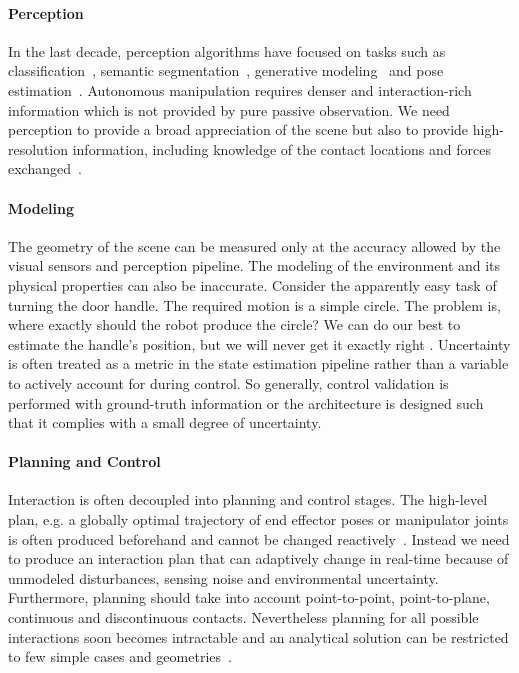\paragraph{Perception}  In the last decade, perception algorithms have focused on tasks such as classification~\citep{redmon2016you}, semantic segmentation~\cite{badrinarayanan2017segnet}, generative modeling~\citep{karras2019stylebased} and pose estimation~\cite{xiang2017posecnn}. Autonomous manipulation requires denser and interaction-rich information which is not provided by pure passive observation. We need perception to provide a broad appreciation of the scene but also to provide high-resolution information, including knowledge of the contact locations and forces exchanged~\cite{mason2018toward}. 

\paragraph{Modeling} The geometry of the scene can be measured only at the accuracy allowed by the visual sensors and perception pipeline. The modeling of the environment and its physical properties can also be inaccurate. Consider the apparently easy task of turning the door handle. The required motion is a simple circle. The problem is, where exactly should the robot produce the circle? We can do our best to estimate the handle’s position, but we will never get it exactly right \citep{mason2018toward}. Uncertainty is often treated as a metric in the state estimation pipeline rather than a variable to actively account for during control. So generally, control validation is performed with ground-truth information or the architecture is designed such that it complies with a small degree of uncertainty.

\paragraph{Planning and Control} Interaction is often decoupled into planning and control stages. The high-level plan, e.g. a globally optimal trajectory of end effector poses or manipulator joints is often produced beforehand and cannot be changed reactively~\cite{chitta2012moveit}. Instead we need to produce an interaction plan that can adaptively change in real-time because of unmodeled disturbances, sensing noise and environmental uncertainty. Furthermore, planning should take into account point-to-point, point-to-plane, continuous and discontinuous contacts. Nevertheless planning for all possible interactions soon becomes intractable and an analytical solution can be restricted to few simple cases and geometries~\cite{lee2015hierarchical, hogan2020reactive}.

